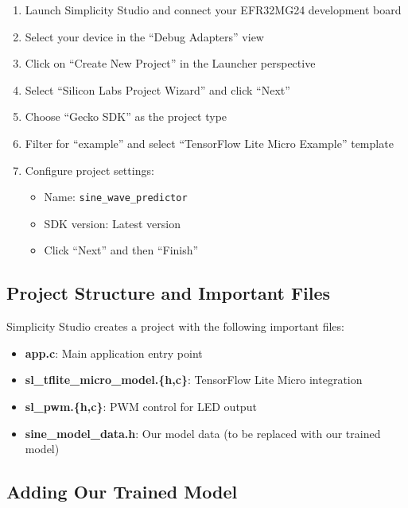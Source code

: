\documentclass[
  9pt,
  letterpaper,
  abstract,
  titlepage]{scrbook}
\providecommand{\tightlist}{%
  \setlength{\itemsep}{0pt}\setlength{\parskip}{0pt}}\usepackage{longtable,booktabs,array}
\def\tightlist{}
\let\tightlist\relax
\begin{document}
\begin{enumerate}
\def\labelenumi{\arabic{enumi}.}
\tightlist
\item
  Launch Simplicity Studio and connect your EFR32MG24 development board
\item
  Select your device in the ``Debug Adapters'' view
\item
  Click on ``Create New Project'' in the Launcher perspective
\item
  Select ``Silicon Labs Project Wizard'' and click ``Next''
\item
  Choose ``Gecko SDK'' as the project type
\item
  Filter for ``example'' and select ``TensorFlow Lite Micro Example''
  template
\item
  Configure project settings:

  \begin{itemize}
  \tightlist
  \item
    Name: \texttt{sine\_wave\_predictor}
  \item
    SDK version: Latest version
  \item
    Click ``Next'' and then ``Finish''
  \end{itemize}
\end{enumerate}

\subsection{Project Structure and Important
Files}\label{project-structure-and-important-files}

Simplicity Studio creates a project with the following important files:

\begin{itemize}
\tightlist
\item
  \textbf{app.c}: Main application entry point
\item
  \textbf{sl\_tflite\_micro\_model.\{h,c\}}: TensorFlow Lite Micro
  integration
\item
  \textbf{sl\_pwm.\{h,c\}}: PWM control for LED output
\item
  \textbf{sine\_model\_data.h}: Our model data (to be replaced with our
  trained model)
\end{itemize}

\subsection{Adding Our Trained Model}\label{adding-our-trained-model}
\end{document}
